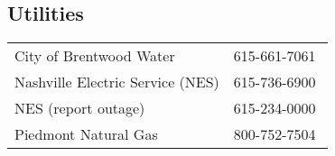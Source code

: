 \subsection{Utilities}

\begin{tabular}{ll}
	City of Brentwood Water & 615-661-7061 \\
	Nashville Electric Service (NES) & 615-736-6900 \\
	NES (report outage) & 615-234-0000 \\
	Piedmont Natural Gas & 800-752-7504 \\
\end{tabular}

